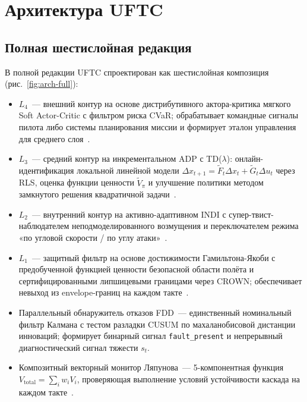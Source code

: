 \documentclass[a4paper,14pt]{extarticle}
\newcommand{\UFTC}{\textsc{UFTC}}
\newcommand{\FDD}{\textsc{FDD}}
\newcommand{\RLS}{\textsc{RLS}}
\begin{document}
\section{Архитектура UFTC}
\label{sec:arch}

\subsection{Полная шестислойная редакция}

В полной редакции \UFTC{} спроектирован как шестислойная композиция (рис.~\ref{fig:arch-full}):

\begin{itemize}
\item $L_4$~--- внешний контур на основе дистрибутивного актора-критика мягкого Soft Actor-Critic с фильтром риска CVaR; обрабатывает командные сигналы пилота либо системы планирования миссии и формирует эталон управления для среднего слоя~\cite{ma2020dsac}.
\item $L_3$~--- средний контур на инкрементальном ADP с TD($\lambda$): онлайн-идентификация локальной линейной модели $\Delta x_{t+1} = \tilde F_t \Delta x_t + \tilde G_t \Delta u_t$ через \RLS{}, оценка функции ценности $\tilde V_\pi$ и улучшение политики методом замкнутого решения квадратичной задачи~\cite{konatala2024,zhou2018}.
\item $L_2$~--- внутренний контур на активно-адаптивном INDI с супер-твист-наблюдателем неподмоделированного возмущения и переключателем режима «по угловой скорости / по углу атаки»~\cite{aaindi2024,sieberling2010}.
\item $L_1$~--- защитный фильтр на основе достижимости Гамильтона-Якоби с предобученной функцией ценности безопасной области полёта и сертифицированными липшицевыми границами через CROWN; обеспечивает невыход из envelope-границ на каждом такте~\cite{lygeros1999,bansal2017}.
\item Параллельный обнаружитель отказов \FDD{}~--- единственный номинальный фильтр Калмана с тестом разладки CUSUM по махаланобисовой дистанции инноваций; формирует бинарный сигнал \texttt{fault\_present} и непрерывный диагностический сигнал тяжести $s_t$.
\item Композитный векторный монитор Ляпунова~--- 5-компонентная функция $V_{\text{total}} = \sum_i w_i V_i$, проверяющая выполнение условий устойчивости каскада на каждом такте~\cite{khalil2002}.
\end{itemize}
\end{document}
